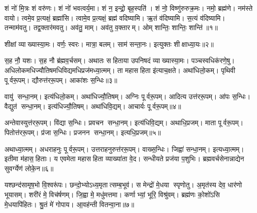 \setcounter{anuvakam}{0}

शं नो॑ मि॒त्रः  शं वरु॑णः। शं नो॑ भवत्वर्य॒मा। शं न॒ इन्द्रो॒ बृह॒स्पति॑। शं नो॒ विष्णु॑रुरुक्र॒मः। नमो॒ ब्रह्म॑णे। नम॑स्ते वायो। त्वमे॒व प्र॒त्यक्षं॒ ब्रह्मा॑सि। त्वामे॒व प्र॒त्यक्षं॒ ब्रह्म॑ वदिष्यामि। ऋ॒तं व॑दिष्यामि। स॒त्यं व॑दिष्यामि। तन्माम॑वतु। तद्व॒क्तार॑मवतु। अव॑तु॒ माम्। अव॑तु व॒क्तारम्। ओम् शान्तिः॒ शान्तिः॒ शान्ति॑॥१॥
\anuvakamend[स॒त्यं व॑दिष्यामि॒ पञ्च॑ च]

शीक्षां व्याख्यास्या॒मः। वर्णः॒ स्वरः। मात्रा॒ बलम्। साम॑ सन्ता॒नः। इत्युक्तः  शीक्षाध्या॒यः॥२॥
\anuvakamend[शीक्षां पञ्च॑]

स॒ह नौ॒ यशः। स॒ह नौ ब्र॑ह्मव॒र्चसम्। अथातः सहिताया उपनिषदं व्याख्यास्या॒मः। पञ्चस्वधिक॑रणे॒षु। अधिलोकमधि\-ज्यौतिषमधि\-विद्यमधि\-प्रज॑मध्या॒त्मम्। ता महासहिता इ॑त्याच॒क्षते। अथा॑धिलो॒कम्। पृथिवी पूर्वरू॒पम्। द्यौरुत्त॑ररू॒पम्। आका॑शः स॒न्धिः॥३॥

वायु॑ सन्धा॒नम्। इत्य॑धिलो॒कम्। अथा॑धिज्यौ॒तिषम्। अग्निः पूर्वरू॒पम्। आदित्य उत्त॑ररू॒पम्। आ॑पः स॒न्धिः। वैद्युत॑ सन्धा॒नम्। इत्य॑धिज्यौ॒तिषम्। अथा॑धिवि॒द्यम्। आचार्यः पूर्वरू॒पम्॥४॥

अन्तेवास्युत्त॑ररू॒पम्। वि॑द्या स॒न्धिः। प्रवचन सन्धा॒नम्। इत्य॑धिवि॒द्यम्। अथाधि॒प्रजम्। माता पूर्वरू॒पम्। पितोत्त॑ररू॒पम्। प्र॑जा स॒न्धिः। प्रजनन सन्धा॒नम्। इत्यधि॒प्रजम्॥५॥

अथाध्या॒त्मम्। अधराहनुः पूर्वरू॒पम्। उत्तराहनुरुत्त॑ररू॒पम्। वाख्स॒न्धिः। जिह्वा॑ सन्धा॒नम्। इत्यध्या॒त्मम्। इतीमा म॑हास॒हिताः। य एवमेता महासहिता व्याख्या॑ता वे॒द। सन्धीयते प्रज॑या प॒शुभिः। ब्रह्मवर्चसेनान्नाद्येन सुवर्ग्येण॑ लोके॒न॥६॥
\anuvakamend[स॒न्धिराचार्यः पूर्वरू॒पमित्यधि॒प्रजं लो॑के॒न]

यश्छन्द॑सामृष॒भो वि॒श्वरू॑पः। छन्दो॒भ्योऽध्य॒मृतात्सम्ब॒भूव॑। स मेन्द्रो॑ मे॒धया स्पृणोतु। अ॒मृत॑स्य देव॒ धार॑णो भूयासम्। शरी॑रं मे॒ विच॑र्\mbox{}षणम्। जि॒ह्वा मे॒ मधु॑मत्तमा। कर्णाभ्यां॒ भूरि॒ विश्रु॑वम्। ब्रह्म॑णः को॒शो॑ऽसि मे॒धयापि॑हितः। श्रु॒तं मे॑ गोपाय। आ॒वह॑न्ती वितन्वा॒ना॥७॥

